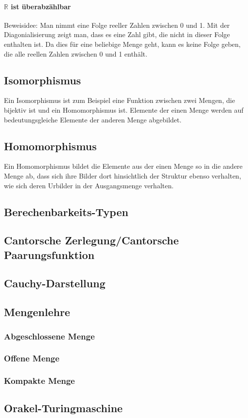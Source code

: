 \documentclass[ngerman]{scrartcl}
\begin{document}
\paragraph{$ \mathbb{R} $ ist überabzählbar}

Beweisidee: Man nimmt eine Folge reeller Zahlen zwischen 0 und 1. Mit der Diagonialisierung zeigt man, dass es eine Zahl gibt, die nicht in dieser Folge enthalten ist. Da dies für eine beliebige Menge geht, kann es keine Folge geben, die alle reellen Zahlen zwischen 0 und 1 enthält.


\subsection{Isomorphismus}
Ein Isomorphismus ist zum Beispiel eine Funktion zwischen zwei Mengen, die bijektiv ist und ein Homomorphismus ist. Elemente der einen Menge werden auf bedeutungsgleiche Elemente der anderen Menge abgebildet.

\subsection{Homomorphismus}
Ein Homomorphismus bildet die Elemente aus der einen Menge so in die andere Menge ab, dass sich ihre Bilder dort hinsichtlich der Struktur ebenso verhalten, wie sich deren Urbilder in der Ausgangsmenge verhalten.

\subsection{Berechenbarkeits-Typen}


\subsection{Cantorsche Zerlegung/Cantorsche Paarungsfunktion} 


\subsection{Cauchy-Darstellung}


\subsection{Mengenlehre}


\subsubsection{Abgeschlossene Menge}


\subsubsection{Offene Menge}

\subsubsection{Kompakte Menge}

\subsection{Orakel-Turingmaschine}

\
\end{document}
